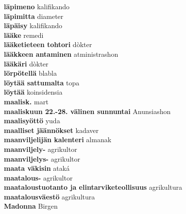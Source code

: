 \textbf{ läpimeno  } kalifikando \\
\textbf{ läpimitta  } diameter \\
\textbf{ läpäisy  } kalifikando \\
\textbf{ lääke  } remedi \\
\textbf{ lääketieteen tohtori  } dòkter \\
\textbf{ lääkkeen antaminen  } atministrashon \\
\textbf{ lääkäri  } dòkter \\
\textbf{ lörpötellä  } blabla \\
\textbf{ löytää sattumalta  } topa \\
\textbf{ löytää  } koinsidensia \\
\textbf{ maalisk.  } mart \\
\textbf{ maaliskuun 22.-28. välinen sunnuntai  } Anunsiashon \\
\textbf{ maalisyöttö  } yuda \\
\textbf{ maalliset jäännökset  } kadaver \\
\textbf{ maanviljelijän kalenteri  } almanak \\
\textbf{ maanviljely-  } agrikultor \\
\textbf{ maanviljelys-  } agrikultor \\
\textbf{ maata väkisin  } ataká \\
\textbf{ maatalous-  } agrikultor \\
\textbf{ maataloustuotanto ja elintarviketeollisuus  } agrikultura \\
\textbf{ maatalousväestö  } agrikultura \\
\textbf{ Madonna  } Birgen \\
